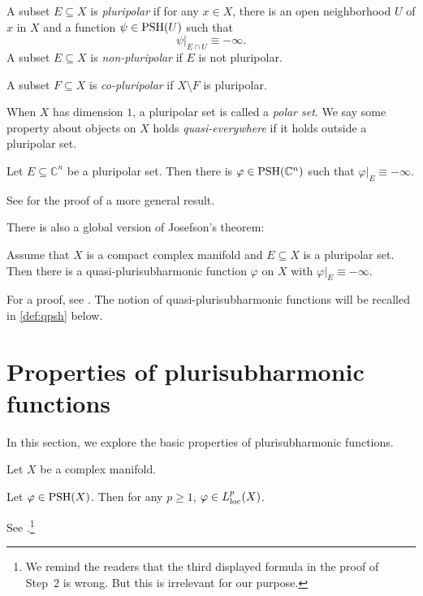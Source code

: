 \begin{definition}\label{def:pluripolarsets}
    A subset $E\subseteq X$ is \emph{pluripolar} if for any $x\in X$, there is an open neighborhood $U$ of $x$ in $X$ and a function $\psi\in \mathrm{PSH}(U)$ such that
    \[
    \psi|_{E\cap U}\equiv -\infty.
    \]
    A subset $E\subseteq X$ is \emph{non-pluripolar} if $E$ is not pluripolar.

    A subset $F\subseteq X$ is \emph{co-pluripolar} if $X\setminus F$ is pluripolar.
\end{definition}
When $X$ has dimension $1$, a pluripolar set is called a \emph{polar set}. We say some property about objects on $X$ holds \emph{quasi-everywhere} if it holds outside a pluripolar set.


\begin{theorem}\label{thm:Josefson}
    Let $E\subseteq \mathbb{C}^n$ be a pluripolar set. Then there is $\varphi\in \mathrm{PSH}(\mathbb{C}^n)$ such that $\varphi|_E\equiv -\infty$.
\end{theorem}
See \cite[Corollary~4.41]{GZ17} for the proof of a more general result.

There is also a global version of Josefson's theorem:
\begin{theorem}\label{thm:gloJosefson}
    Assume that $X$ is a compact complex manifold and $E\subseteq X$ is a pluripolar set. Then there is a quasi-plurisubharmonic function $\varphi$ on $X$ with $\varphi|_E\equiv -\infty$.
\end{theorem}
For a proof, see \cite{Vu19}. The notion of quasi-plurisubharmonic functions will be recalled in \cref{def:qpsh} below.


\section{Properties of plurisubharmonic functions}
\label{sec:psh_properties}
In this section, we explore the basic properties of plurisubharmonic functions.

Let $X$ be a complex manifold.

\begin{proposition}\label{prop:pshlocLp}
    Let $\varphi\in \mathrm{PSH}(X)$. Then for any $p\geq 1$, $\varphi\in L^p_{\mathrm{loc}}(X)$.
\end{proposition}
See \cite[Theorem~1.46, Theorem~1.48]{GZ17}.\footnote{We remind the readers that the third displayed formula in the proof of \cite[Theorem~1.48]{GZ17} Step~2 is wrong. But this is irrelevant for our purpose.}

